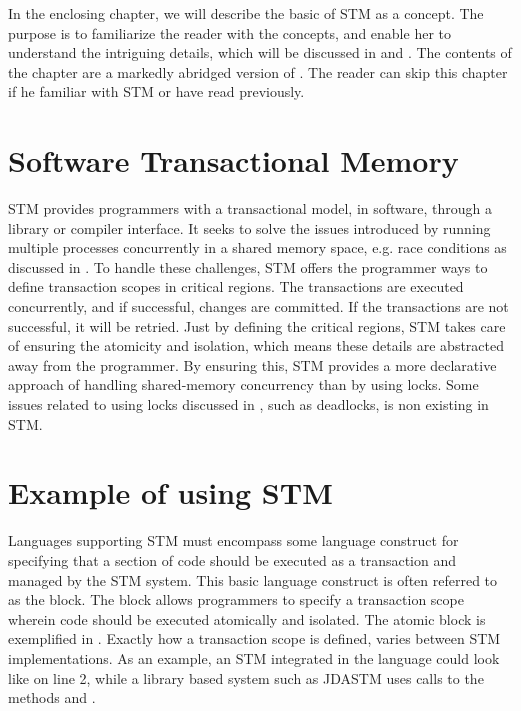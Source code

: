 \makeatletter {}\makeatother
{}
In the enclosing chapter, we will describe the basic of \ac{STM} as a concept. The purpose is to familiarize the reader with the concepts, and enable her to understand the intriguing details, which will be discussed in  and . The contents of the chapter are a markedly abridged version of \cite[p. 43-48]{dpt907e14trending}. The reader can skip this chapter if he familiar with \ac{STM} or have read \cite[chap. 5]{dpt907e14trending} previously.
\label{chap:stm_key_concepts}

\section{Software Transactional Memory}
\ac{STM} provides programmers with a transactional model, in software, through a library or compiler interface\cite{herlihy2011tm}. It seeks to solve the issues introduced by running multiple processes concurrently in a shared memory space, e.g. race conditions as discussed in \cite[p. 22-26]{dpt907e14trending}. To handle these challenges, \ac{STM} offers the programmer ways to define transaction scopes in critical regions. The transactions are executed concurrently, and if successful, changes are committed. If the transactions are not successful, it will be retried. Just by defining the critical regions, \ac{STM} takes care of ensuring the atomicity and isolation, which means these details are abstracted away from the programmer\cite[p. 48]{harris2005composable}. By ensuring this, \ac{STM} provides a more declarative approach of handling shared-memory concurrency than by using locks. Some issues related to using locks discussed in \cite[p. 26-30]{dpt907e14trending}, such as deadlocks, is non existing in \ac{STM}.

\section{Example of using STM}
\label{sec:stm_keyconcepts_example}
Languages supporting \ac{STM} must encompass some language construct for specifying that a section of code should be executed as a transaction and managed by the \ac{STM} system. This basic language construct is often referred to as the  block\cite[p. 49]{harris2005composable}\cite[p. 3]{harris2003language}. The  block allows programmers to specify a transaction scope wherein code should be executed atomically and isolated. The atomic block is exemplified in . Exactly how a transaction scope is defined, varies between \ac{STM} implementations. As an example, an \ac{STM} integrated in the language could look like  on line 2, while a library based system such as JDASTM\cite{ramadan2009committing} uses calls to the methods  and .


